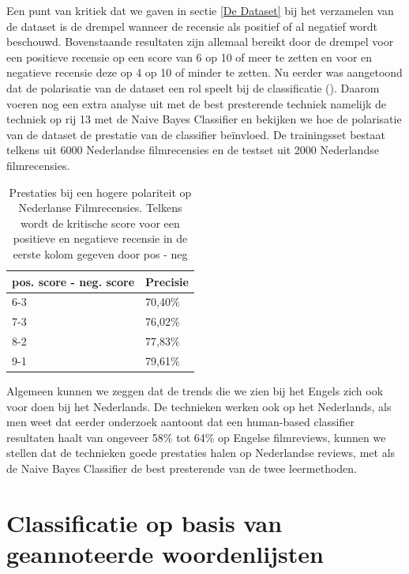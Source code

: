 Een punt van kritiek dat we gaven in sectie \ref{De Dataset} bij het verzamelen van de dataset is de drempel wanneer de recensie als positief of al negatief wordt beschouwd. Bovenstaande resultaten zijn allemaal bereikt door de drempel voor een positieve recensie op een score van 6 op 10 of meer te zetten en voor en negatieve recensie deze op 4 op 10 of minder te zetten.
Nu eerder was aangetoond dat de polarisatie van de dataset een rol speelt bij de classificatie (\cite{maas-EtAl:2011:ACL-HLT2011}). Daarom voeren nog een extra analyse uit met de best presterende techniek namelijk de techniek op rij 13 met de Naive Bayes Classifier en bekijken we hoe de polarisatie van de dataset de prestatie van de classifier be\"invloed. De trainingsset bestaat telkens uit 6000 Nederlandse filmrecensies en de testset uit 2000 Nederlandse filmrecensies.


\begin{table}[h]
\centering
\begin{tabular}{|l|l|}
\hline
\cline{2-2}
pos. score - neg. score    & Precisie \\ \hline
\multicolumn{1}{|l|}{6-3} & 70,40\%  \\ \hline
\multicolumn{1}{|l|}{7-3} & 76,02\%  \\ \hline
\multicolumn{1}{|l|}{8-2} & 77,83\%  \\ \hline
\multicolumn{1}{|l|}{9-1} & 79,61\%  \\ \hline
\end{tabular}
\caption{Prestaties bij een hogere polariteit op Nederlanse Filmrecensies. Telkens wordt de kritische score voor een positieve en negatieve recensie in de eerste kolom gegeven door pos - neg  }
\end{table}


Algemeen kunnen we zeggen dat de trends die we zien bij het Engels zich ook voor doen bij het Nederlands. De technieken werken ook op het Nederlands, als men weet dat eerder onderzoek \cite{pang2002thumbs} aantoont dat een human-based classifier resultaten haalt van ongeveer 58\% tot 64\% op Engelse filmreviews, kunnen we stellen dat de technieken goede prestaties halen op Nederlandse reviews, met als de Naive Bayes Classifier de best presterende van de twee leermethoden.


\section{Classificatie op basis van geannoteerde woordenlijsten}\label{Classificatie op basis van geannoteerde woordenlijsten}

